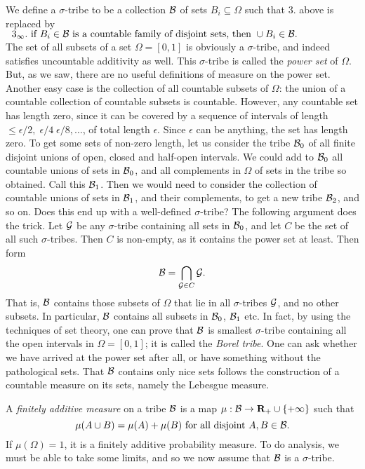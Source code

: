 We define a
$\sigma$-tribe to be a collection ${\cal B}$ of sets $B_i\subseteq\Omega$
such that 3. above is replaced by\\
$\;\;3_\infty.\mbox{ if }B_i\in{\cal B} \mbox{ is a countable family of disjoint
sets, then }\cup B_i\in{\cal B}.$\\
The set of all subsets of a set $\Omega=[0,1]$ is obviously a $\sigma$-tribe,
and indeed satisfies uncountable additivity as well. This $\sigma$-tribe is
called the {\em power set} of $\Omega$. But, as we saw, there are no
useful definitions of measure on the power set. Another easy case is the
collection of all countable subsets of $\Omega$: the union of
a countable collection of countable subsets is countable. However, any
countable set has length zero, since it can be covered by a sequence
of intervals of length $\leq\epsilon/2,\;\epsilon/4\;\epsilon/8,\ldots$, of total
length $\epsilon$. Since $\epsilon$ can be anything, the set has length zero.
To get some sets of non-zero length, let us consider the tribe ${\cal B}_0$
of all finite disjoint unions of open, closed and half-open intervals. We
could add to ${\cal B}_0$ all countable unions of sets in ${\cal B}_0$, and
all complements in $\Omega$ of sets in the tribe so obtained. Call this
${\cal B}_1$. Then we would need to consider the
collection of countable unions of sets in ${\cal B}_1$, and their
complements, to get a new tribe ${\cal B}_2$, and so on. Does this end
up with a well-defined $\sigma$-tribe?
The following argument does the trick. Let ${\cal G}$ be any $\sigma$-tribe
containing all sets in ${\cal B}_0$, and let $C$ be the set of all
such $\sigma$-tribes. Then $C$ is non-empty, as it
contains the power set at least. Then form
\begin{equation}
{\cal B}=\bigcap_{{\cal G}\in C}{\cal G}.
\end{equation}
That is, ${\cal B}$ contains those subsets of $\Omega$ that lie in all
$\sigma$-tribes ${\cal G}$, and no other subsets. In particular, ${\cal B}$
contains all subsets in ${\cal B}_0$, ${\cal B}_1$ etc. In fact, by using
the techniques of set theory, one can prove that ${\cal B}$ is
smallest $\sigma$-tribe containing all the open
intervals in $\Omega=[0,1]$; it is called the {\em Borel tribe}. One can ask
whether we have arrived at the power set after all, or have something
without the pathological sets. That ${\cal B}$ contains only nice sets
follows the construction of a countable measure on its sets, namely
the Lebesgue measure.


A {\em finitely additive measure} on a tribe ${\cal B}$
is a map $\mu:{\cal B}\rightarrow {\bf R}_+\cup\{+\infty\}$ such that
\[\mu(A\cup B)=\mu(A)+\mu(B)\mbox{ for all disjoint }A, B\in{\cal B}.\]
If $\mu(\Omega)=1$, it is a finitely additive probability measure.
To do analysis, we must be able to take some limits, and so we
now assume that ${\cal B}$ is a $\sigma$-tribe.

